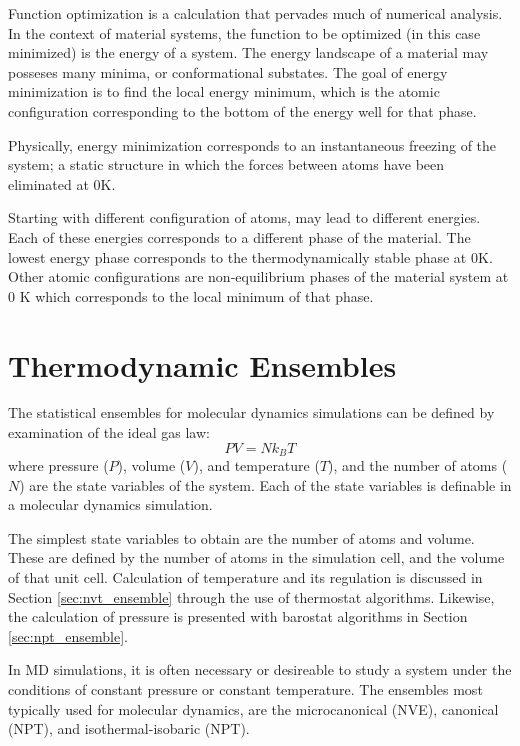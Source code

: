 Function optimization is a calculation that pervades much of numerical analysis.  In the context of material systems, the function to be optimized (in this case minimized) is the energy of a system.  The energy landscape of a material may posseses many minima, or conformational substates.  The goal of energy minimization is to find the local energy minimum, which is the atomic configuration corresponding to the bottom of the energy well for that phase.

Physically, energy minimization corresponds to an instantaneous freezing of the system; a static structure in which the forces between atoms have been eliminated at $0 \mathrm{K}$.

Starting with different configuration of atoms, may lead to different energies.  Each of these energies corresponds to a different phase of the material.  The lowest energy phase corresponds to the thermodynamically stable phase at $0 \mathrm{K}$.  Other atomic configurations are non-equilibrium phases of the material system at $0$ K which corresponds to the local minimum of that phase.

\section{Thermodynamic Ensembles}
  The statistical ensembles for molecular dynamics simulations can be defined by examination of the ideal gas law:
  \begin{equation}
  \label{eq:ideal_gas_law}
    PV = N k_B T
  \end{equation}
  where pressure ($P$), volume ($V$), and temperature ($T$), and the number of atoms ($N$) are the state variables of the system.  Each of the state variables is definable in a molecular dynamics simulation.

  The simplest state variables to obtain are the number of atoms and volume.  These are defined by the number of atoms in the simulation cell, and the volume of that unit cell.  Calculation of temperature and its regulation is discussed in Section \ref{sec:nvt_ensemble} through the use of thermostat algorithms.  Likewise, the calculation of pressure is presented with barostat algorithms in Section \ref{sec:npt_ensemble}.

  In MD simulations, it is often necessary or desireable to study a system under the conditions of constant pressure or constant temperature.  The ensembles most typically used for molecular dynamics, are the microcanonical (NVE), canonical (NPT), and isothermal-isobaric (NPT).


